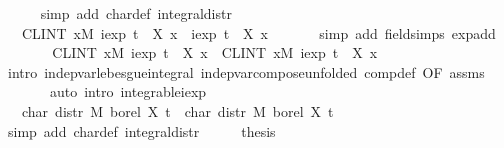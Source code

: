 \documentclass{article}
\theoremstyle{definition}
\begin{document}
\begin{isabellebody}
\ \ \ \ \isamarkupfalse%
\ {\isacharparenleft}simp\ add{\isacharcolon}\ char{\isacharunderscore}def\ integral{\isacharunderscore}distr{\isacharparenright}\isanewline
\ \ \isamarkupfalse%
\ \isamarkupfalse%
\ {\isachardoublequoteopen}{\isasymdots}\ {\isacharequal}\ {\isacharparenleft}CLINT\ x{\isacharbar}M{\isachardot}\ iexp\ {\isacharparenleft}t\ {\isacharasterisk}\ {\isacharparenleft}X{}\ x{\isacharparenright}{\isacharparenright}\ {\isacharasterisk}\ iexp\ {\isacharparenleft}t\ {\isacharasterisk}\ {\isacharparenleft}X{}\ x{\isacharparenright}{\isacharparenright}{\isacharparenright}\ {\isachardoublequoteclose}\isanewline
\ \ \ \ \isamarkupfalse%
\ {\isacharparenleft}simp\ add{\isacharcolon}\ field{\isacharunderscore}simps\ exp{\isacharunderscore}add{\isacharparenright}\isanewline
\ \ \isamarkupfalse%
\ \isamarkupfalse%
\ {\isachardoublequoteopen}{\isasymdots}\ {\isacharequal}\ {\isacharparenleft}CLINT\ x{\isacharbar}M{\isachardot}\ iexp\ {\isacharparenleft}t\ {\isacharasterisk}\ {\isacharparenleft}X{}\ x{\isacharparenright}{\isacharparenright}{\isacharparenright}\ {\isacharasterisk}\ {\isacharparenleft}CLINT\ x{\isacharbar}M{\isachardot}\ iexp\ {\isacharparenleft}t\ {\isacharasterisk}\ {\isacharparenleft}X{}\ x{\isacharparenright}{\isacharparenright}{\isacharparenright}{\isachardoublequoteclose}\isanewline
\ \ \ \ \isamarkupfalse%
\ {\isacharparenleft}intro\ indep{\isacharunderscore}var{\isacharunderscore}lebesgue{\isacharunderscore}integral\ indep{\isacharunderscore}var{\isacharunderscore}compose{\isacharbrackleft}unfolded\ comp{\isacharunderscore}def{\isacharcomma}\ OF\ assms{\isacharbrackright}{\isacharparenright}\isanewline
\ \ \ \ \ \ \ {\isacharparenleft}auto\ intro{\isacharbang}{\isacharcolon}\ integrable{\isacharunderscore}iexp{\isacharparenright}\isanewline
\ \ \isamarkupfalse%
\ \isamarkupfalse%
\ {\isachardoublequoteopen}{\isasymdots}\ {\isacharequal}\ char\ {\isacharparenleft}distr\ M\ borel\ X{}{\isacharparenright}\ t\ {\isacharasterisk}\ char\ {\isacharparenleft}distr\ M\ borel\ X{}{\isacharparenright}\ t{\isachardoublequoteclose}\isanewline
\ \ \ \ \isamarkupfalse%
\ {\isacharparenleft}simp\ add{\isacharcolon}\ char{\isacharunderscore}def\ integral{\isacharunderscore}distr{\isacharparenright}\isanewline
\ \ \isamarkupfalse%
\ \isamarkupfalse%
\ {\isacharquery}thesis\ \isacommand{{\isachardot}}\isamarkupfalse%

\end{isabellebody}
\end{document}
